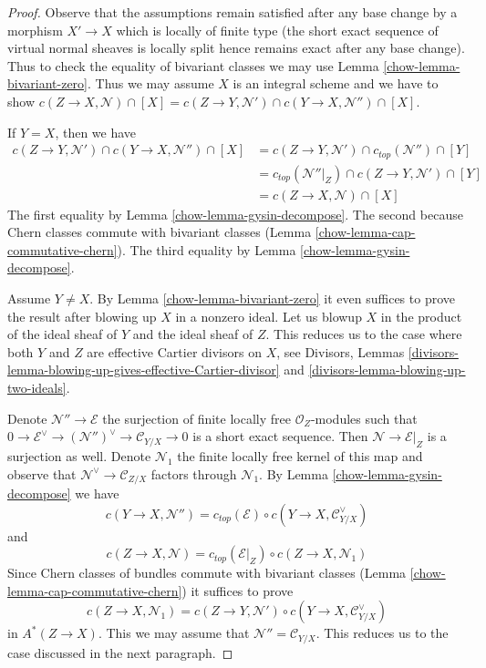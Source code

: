 \begin{proof}

Observe that the assumptions remain satisfied after any base change
by a morphism $X' \to X$ which is locally of finite type (the short
exact sequence of virtual normal sheaves is locally split hence
remains exact after any base change). Thus to check the
equality of bivariant classes we may use Lemma \ref{chow-lemma-bivariant-zero}.
Thus we may assume $X$ is an integral scheme and we have to show
$c(Z \to X, \mathcal{N}) \cap [X] =
c(Z \to Y, \mathcal{N}') \cap c(Y \to X, \mathcal{N}'') \cap [X]$.

\medskip\noindent
If $Y = X$, then we have
\begin{align*}
c(Z \to Y, \mathcal{N}') \cap c(Y \to X, \mathcal{N}'') \cap [X]
& =
c(Z \to Y, \mathcal{N}') \cap c_{top}(\mathcal{N}'') \cap [Y] \\
& =
c_{top}(\mathcal{N}''|_Z) \cap c(Z \to Y, \mathcal{N}') \cap [Y] \\
& =
c(Z \to X, \mathcal{N}) \cap [X]
\end{align*}
The first equality by Lemma \ref{chow-lemma-gysin-decompose}.
The second because Chern classes commute with bivariant classes
(Lemma \ref{chow-lemma-cap-commutative-chern}).
The third equality by Lemma \ref{chow-lemma-gysin-decompose}.

\medskip\noindent
Assume $Y \not = X$. By Lemma \ref{chow-lemma-bivariant-zero}
it even suffices to prove the result after blowing up $X$ in a nonzero ideal.
Let us blowup $X$ in the product of the ideal sheaf of $Y$ and the ideal
sheaf of $Z$. This reduces us to the case where both $Y$ and $Z$ are
effective Cartier divisors on $X$, see
Divisors, Lemmas
\ref{divisors-lemma-blowing-up-gives-effective-Cartier-divisor} and
\ref{divisors-lemma-blowing-up-two-ideals}.

\medskip\noindent
Denote $\mathcal{N}'' \to \mathcal{E}$ the surjection of finite locally
free $\mathcal{O}_Z$-modules such that
$0 \to \mathcal{E}^\vee \to (\mathcal{N}'')^\vee \to \mathcal{C}_{Y/X} \to 0$
is a short exact sequence. Then $\mathcal{N} \to \mathcal{E}|_Z$
is a surjection as well. Denote $\mathcal{N}_1$ the finite locally free kernel
of this map and observe that $\mathcal{N}^\vee \to \mathcal{C}_{Z/X}$
factors through $\mathcal{N}_1$.
By Lemma \ref{chow-lemma-gysin-decompose} we have
$$
c(Y \to X, \mathcal{N}'') = c_{top}(\mathcal{E}) \circ
c(Y \to X, \mathcal{C}_{Y/X}^\vee)
$$
and
$$
c(Z \to X, \mathcal{N}) = c_{top}(\mathcal{E}|_Z) \circ
c(Z \to X, \mathcal{N}_1)
$$
Since Chern classes of bundles commute with bivariant classes
(Lemma \ref{chow-lemma-cap-commutative-chern})
it suffices to prove
$$
c(Z \to X, \mathcal{N}_1) =
c(Z \to Y, \mathcal{N}') \circ c(Y \to X, \mathcal{C}_{Y/X}^\vee)
$$
in $A^*(Z \to X)$. This we may assume that $\mathcal{N}'' = \mathcal{C}_{Y/X}$.
This reduces us to the case discussed in the next paragraph.


\end{proof}
